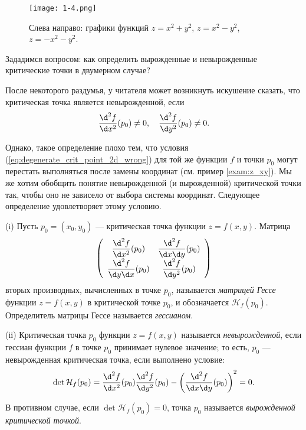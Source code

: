 \documentclass[a4paper,12pt,openany,leqno]{extbook}
\begin{document}
    \begin{figure}[t]
    \texttt{[image: 1-4.png]}
    \caption{Слева направо: графики функций $z = x^2 + y^2$, $z = x^2 - y^2$, $z = -x^2 - y^2$.}
    \label{fig:three_functions_2d}
    \end{figure}
    
    Зададимся вопросом: как определить вырожденные и невырожденные критические точки в двумерном случае?
    
    После некоторого раздумья, у читателя может возникнуть искушение сказать, что критическая точка является невырожденной, если
    \begin{equation}
    \frac{\d^2 f}{\d x^2}(p_0) \neq 0,\quad \frac{\d^2 f}{\d y^2}(p_0) \neq 0.
    \label{eq:degenerate_crit_point_2d_wrong}
    \end{equation}
    
    Однако, такое определение плохо тем, что условия (\ref{eq:degenerate_crit_point_2d_wrong}) для той же функции $f$ и точки $p_0$ могут перестать выполняться после замены координат (см. пример \ref{exam:z_xy}). Мы же хотим обобщить понятие невырожденной (и вырожденной) критической точки так, чтобы оно не зависело от выбора системы координат. Следующее определение удовлетворяет этому условию.
    
    \begin{definition} (i)
    Пусть $p_0 = (x_0, y_0)$ --- критическая точка функции $z = f(x, y)$. Матрица
    \begin{equation}
\left(
  \begin{array}{cc}
    \dfrac{\d^2 f}{\d x^2}(p_0) & \dfrac{\d^2 f}{\d x \d y}(p_0)\\
    \dfrac{\d^2 f}{\d y \d x}(p_0) & \dfrac{\d^2 f}{\d y^2}(p_0)
  \end{array}
\right)
    \label{eq:hessian_2d}
    \end{equation}
    вторых производных, вычисленных в точке $p_0$, называется \emph{матрицей Гессе} функции $z = f(x, y)$ в критической точке $p_0$, и обозначается $\mathcal{H}_f(p_0)$. Определитель матрицы Гессе называется \emph{гессианом}.
    
    (ii) Критическая точка $p_0$ функции $z = f(x, y)$ называется \emph{невырожденной}, если гессиан функции $f$ в точке $p_0$ принимает нулевое значение; то есть, $p_0$ --- невырожденная критическая точка, если выполнено условие:
\begin{equation}
\det \mathcal{H}_f(p_0) = \dfrac{\d^2 f}{\d x^2}(p_0) \dfrac{\d^2 f}{\d y^2}(p_0) - \left(\dfrac{\d^2 f}{\d x \d y}(p_0)\right)^2 = 0.
\label{eq:nondegeneracy_2d}
\end{equation}

    В противном случае, если $\det \mathcal{H}_f(p_0) = 0$, точка $p_0$ называется \emph{вырожденной критической точкой}.
    \label{eq:hessian}
    \end{definition}
    
\end{document}
